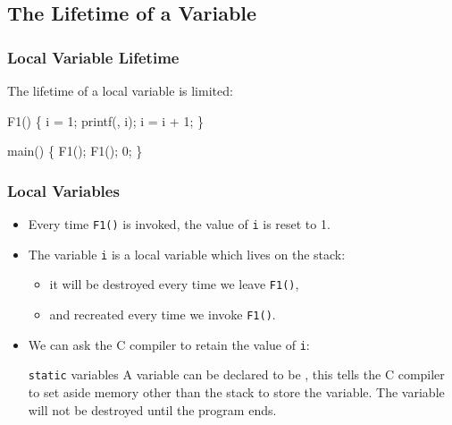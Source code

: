 \documentclass[smaller,handout,table]{beamer}
\begin{document}
\subsection{The Lifetime of a Variable}
\begin{frame}[fragile]
\frametitle{Local Variable Lifetime}
The lifetime of a local variable is limited:
\begin{semiverbatim}
 

 F1()
\{
    i = 1;
   printf(, i);
   i = i + 1; 
\}

 main()
\{
   F1();
   F1();
    0;
\}
\end{semiverbatim}
\end{frame}

\begin{frame}
\frametitle{Local Variables}
\begin{itemize}
\item Every time {\tt F1()} is invoked, the value of {\tt i} is reset to 1.
\item The variable {\tt i} is a local variable which lives on the stack:
\begin{itemize}
\item it will be destroyed every time we leave {\tt F1()},
\item and recreated every time we invoke {\tt F1()}.
\end{itemize}
\item We can ask the C compiler to retain the value of {\tt i}:
\begin{block}{{\tt static} variables}
A variable can be declared to be , this tells the C compiler to set aside memory other than the stack to store the variable. The variable will not be destroyed until the program ends.
\end{block}
\end{itemize}
\end{frame}
\end{document}
